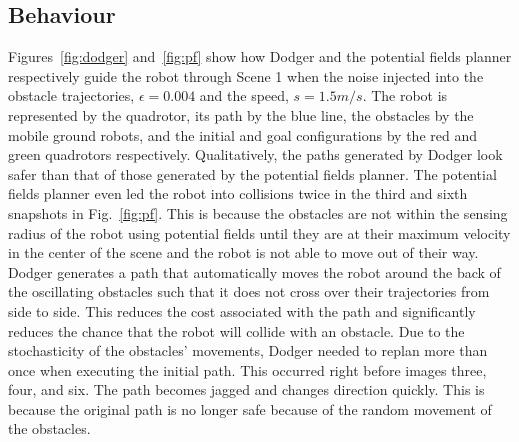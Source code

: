 \documentclass[letterpaper, 10pt, conference]{ieeeconf}
\begin{document}
\subsection{Behaviour}

Figures~\ref{fig:dodger} and~\ref{fig:pf} show how Dodger and the potential
fields planner respectively guide the robot through Scene 1 when the noise
injected into the obstacle trajectories, $\epsilon = 0.004$ and the speed, $s =
1.5 m/s$. The robot is represented by the quadrotor, its path by the blue line,
the obstacles by the mobile ground robots, and the initial and goal
configurations by the red and green quadrotors respectively. Qualitatively, the
paths generated by Dodger look safer than that of those generated by the
potential fields planner.  The potential fields planner even led the robot into
collisions twice in the third and sixth snapshots in Fig.~\ref{fig:pf}. This is
because the obstacles are not within the sensing radius of the robot using
potential fields until they are at their maximum velocity in the center of the
scene and the robot is not able to move out of their way. Dodger generates a
path that automatically moves the robot around the back of the oscillating
obstacles such that it does not cross over their trajectories from side to
side. This reduces the cost associated with the path and significantly reduces
the chance that the robot will collide with an obstacle. Due to the
stochasticity of the obstacles' movements, Dodger needed to replan more than
once when executing the initial path. This occurred right before images three,
four, and six. The path becomes jagged and changes direction quickly. This is
because the original path is no longer safe because of the random movement of
the obstacles.
\end{document}
